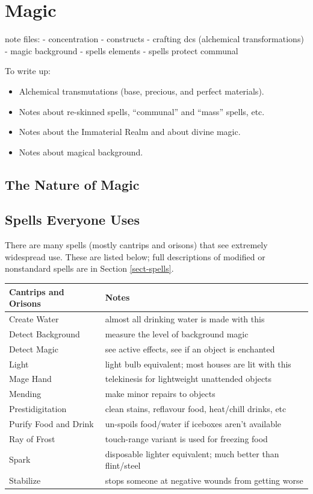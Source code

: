 
\chapter{Magic}
\label{sect-magic}


note files:
- concentration
- constructs
- crafting dcs (alchemical transformations)
- magic background
- spells elements
- spells protect communal

To write up:
\begin{itemize}
\item Alchemical transmutations (base, precious, and perfect materials).
\item Notes about re-skinned spells, ``communal'' and ``mass'' spells, etc.
\item Notes about the Immaterial Realm and about divine magic.
\item Notes about magical background.
\end{itemize}

%
\section{The Nature of Magic}

%

%
\section{Spells Everyone Uses}

There are many spells (mostly cantrips and orisons) that see extremely
widespread use. These are listed below; full descriptions of modified or
nonstandard spells are in Section \ref{sect-spells}.

\begin{tabular}{ll}\hline
\textbf{Cantrips and Orisons} & \textbf{Notes} \\ \hline
Create Water & almost all drinking water is made with this \\
Detect Background & measure the level of background magic \\
Detect Magic & see active effects, see if an object is enchanted \\
Light & light bulb equivalent; most houses are lit with this \\
Mage Hand & telekinesis for lightweight unattended objects \\
Mending & make minor repairs to objects \\
Prestidigitation & clean stains, reflavour food, heat/chill drinks, etc \\
Purify Food and Drink & un-spoils food/water if iceboxes aren't available \\
Ray of Frost & touch-range variant is used for freezing food \\
Spark & disposable lighter equivalent; much better than flint/steel \\
Stabilize & stops someone at negative wounds from getting worse \\
\hline
\end{tabular}

